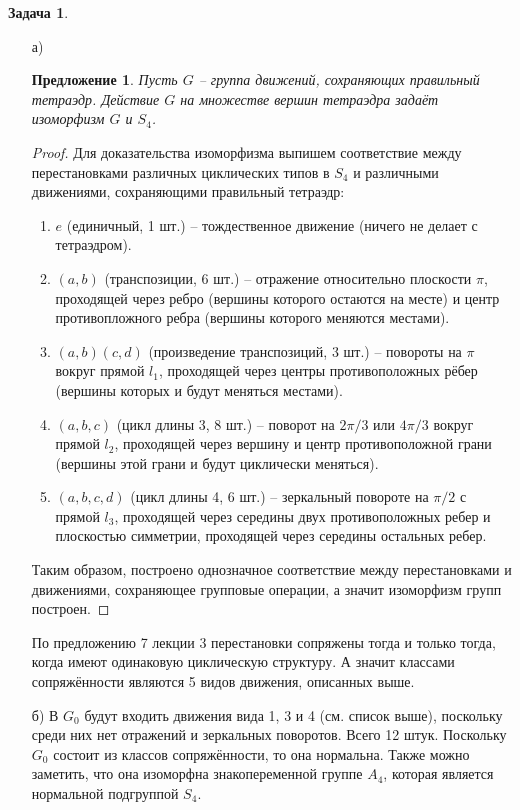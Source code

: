 \documentclass[12pt]{article}
\newtheorem{predl}[theorem]{Предложение}
\theoremstyle{definition}
\newtheorem{zad}{Задача}[section]
\begin{document}
\begin{zad}
\begin{itemize}
    \item[а)]
    \begin{predl}
    Пусть $G$ -- группа движений, сохраняющих правильный тетраэдр. Действие $G$ на множестве вершин тетраэдра задаёт изоморфизм $G$ и $S_4$.
    \end{predl}
    \begin{proof}
    Для доказательства изоморфизма выпишем соответствие между перестановками различных циклических типов в $S_4$ и различными движениями, сохраняющими правильный тетраэдр:
    \begin{enumerate}
        \item $e$ (единичный, 1 шт.) -- тождественное движение (ничего не делает с тетраэдром).
        \item $(a,b)$ (транспозиции, 6 шт.) -- отражение относительно плоскости $\pi$, проходящей через ребро (вершины которого остаются на месте) и центр противопложного ребра (вершины которого меняются местами).
        \item $(a,b)(c,d)$ (произведение транспозиций, 3 шт.) -- повороты на $\pi$ вокруг прямой $l_1$, проходящей через центры противоположных рёбер (вершины которых и будут меняться местами).
        \item $(a,b,c)$ (цикл длины 3, 8 шт.) -- поворот на $2\pi/3$ или $4\pi/3$ вокруг прямой $l_2$, проходящей через вершину и центр противоположной грани (вершины этой грани и будут циклически меняться).
        \item $(a,b,c,d)$ (цикл длины 4, 6 шт.) -- зеркальный повороте на $\pi/2$ с прямой $l_3$, проходящей через середины двух противоположных ребер и плоскостью симметрии, проходящей через середины остальных ребер.
    \end{enumerate}
    Таким образом, построено однозначное соответствие между перестановками и движениями, сохраняющее групповые операции, а значит изоморфизм групп построен.
    \end{proof}
    По предложению 7 лекции 3 перестановки сопряжены тогда и только тогда, когда имеют одинаковую циклическую структуру. А значит классами сопряжённости являются 5 видов движения, описанных выше.
    \item[б)] В $G_0$ будут входить движения вида 1, 3 и 4 (см. список выше), поскольку среди них нет отражений и зеркальных поворотов. Всего 12 штук. Поскольку $G_0$ состоит из классов сопряжённости, то она нормальна. Также можно заметить, что она изоморфна знакопеременной группе $A_4$, которая является нормальной подгруппой $S_4$.\\

\end{itemize}
\end{zad}
\end{document}

